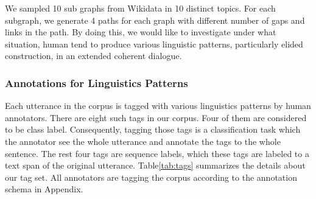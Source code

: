 \documentclass[bsc,frontabs,twoside,singlespacing,parskip,deptreport]{infthesis}     %
\begin{document}
We sampled 10 sub graphs from Wikidata in 10 distinct topics. For each subgraph, we generate 4 paths for each graph with different number of gaps and links in the path. By doing this, we would like to investigate under what situation, human tend to produce various linguistic patterns, particularly elided construction, in an extended coherent dialogue.


\subsubsection*{Annotations for Linguistics Patterns}

Each utterance in the corpus is tagged with various linguistics patterns by human annotators. There are eight such tags in our corpus. Four of them are considered to be class label. Consequently, tagging those tags is a classification task which the annotator see the whole utterance and annotate the tags to the whole sentence. The rest four tags are sequence labels, which these tags are labeled to a text span of the original utterance. Table\ref{tab:tags} summarizes the details about our tag set. All annotators are tagging the corpus according to the annotation schema in Appendix.  
\end{document}
